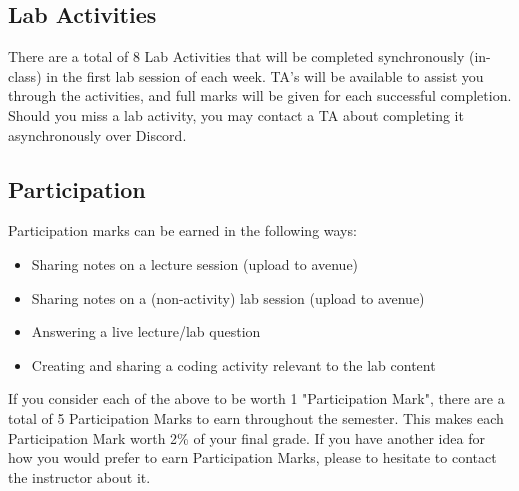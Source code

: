 \documentclass{article}
\begin{document}
\subsection{Lab Activities}
\label{sec:org2011fce}
There are a total of 8 Lab Activities that will be completed synchronously
(in-class) in the first lab session of each week. TA's will be available to
assist you through the activities, and full marks will be given for each
successful completion. Should you miss a lab activity, you may contact a TA
about completing it asynchronously over Discord.

\subsection{Participation}
\label{sec:orgbfb8e42}
Participation marks can be earned in the following ways:
\begin{itemize}
\item Sharing notes on a lecture session (upload to avenue)
\item Sharing notes on a (non-activity) lab session (upload to avenue)
\item Answering a live lecture/lab question
\item Creating and sharing a coding activity relevant to the lab content
\end{itemize}
If you consider each of the above to be worth 1 "Participation Mark", there
are a total of 5 Participation Marks to earn throughout the semester. This
makes each Participation Mark worth 2\% of your final grade. If you have
another idea for how you would prefer to earn Participation Marks, please to
hesitate to contact the instructor about it.
\end{document}
